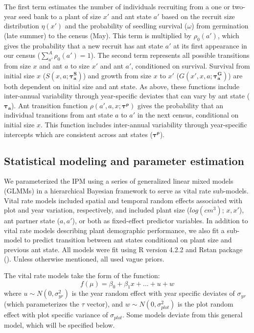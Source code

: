 \documentclass[11pt]{article}
\begin{document}
\noindent The first term estimates the number of individuals recruiting from a one or two-year seed bank to a plant of size $x'$ and ant state $a'$ based on the recruit size distribution $\eta(x')$ and the probability of seedling survival ($\omega$) from germination (late summer) to the census (May).
This term is multiplied by $\rho_{0}(a')$, which gives the probability that a new recruit has ant state $a'$ at its first appearance in our census ($\sum_{a'}^{A}\rho_{0}(a')=1$). 
The second term represents all possible transitions from size $x$ and ant $a$ to size $x'$ and ant $a'$, conditioned on survival. 
Survival from initial size $x$ ($S(x,a;\pmb{\tau^S_{a}})$) and growth from size $x$ to $x'$ ($G(x',x,a;\pmb{\tau^G_{a}})$) are both dependent on initial size and ant state. 
As above, these functions include inter-annual variability through year-specific deviates that can vary by ant state ($\pmb{\tau_{a}}$). 
Ant transition function $\rho(a',a,x;\pmb{\tau^{\rho}})$ gives the probability that an individual transitions from ant state $a$ to $a'$ in the next census, conditional on initial size $x$. 
This function includes inter-annual variability through year-specific intercepts which are consistent across ant states ($\pmb{\tau^\rho}$).

\subsection*{Statistical modeling and parameter estimation}
We parameterized the IPM using a series of generalized linear mixed models (GLMMs) in a hierarchical Bayesian framework to serve as vital rate sub-models. 
Vital rate models included spatial and temporal random effects associated with plot and year variation, respectively, and included plant size ($log(cm^3)$; $x,x'$), ant partner state ($a,a'$), or both as fixed-effect predictor variables. 
In addition to vital rate models describing plant demographic performance, we also fit a sub-model to predict transition between ant states conditional on plant size and previous ant state. 
All models were fit using R version 4.2.2 and Rstan package (\cite{Rstancite, Rcite}).
Unless otherwise mentioned, all used vague priors. 

The vital rate models take the form of the function:
$$ f(\mu) = \beta_0 + \beta_1 x + ... + u + w $$
\noindent where $u \sim N(0,\sigma_{yr }^{2})$ is the year random effect with year specific deviates of $\sigma_{yr}$ (which parameterizes the $\tau$ vector), and $w \sim N(0,\sigma_{plot}^{2})$ is the plot random effect with plot specific variance of $\sigma_{plot}$. 
Some models deviate from this general model, which will be specified below.
\end{document}
